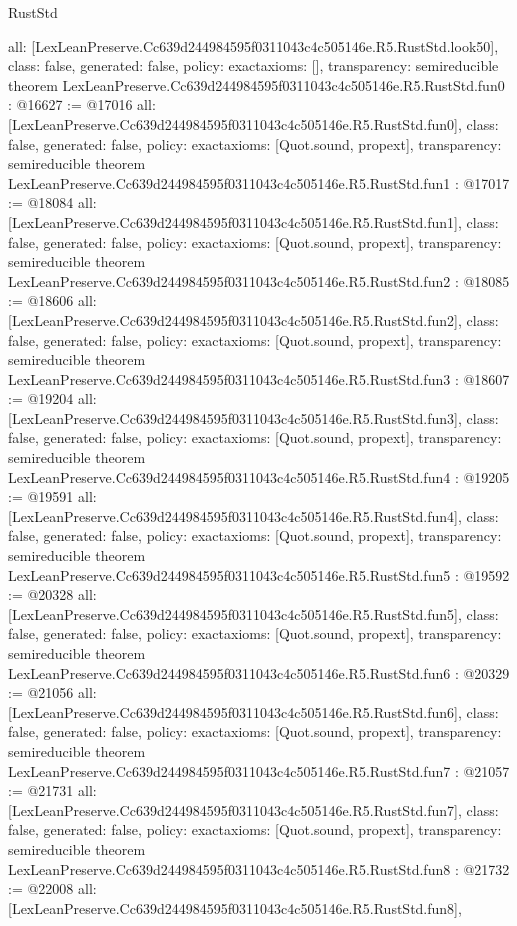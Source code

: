 \begin{lexlean}{RustStd}
\begin{coremodule}
{  all: [LexLeanPreserve.Cc639d244984595f0311043c4c505146e.R5.RustStd.look50],
  class: false,
  generated: false,
  policy: exact{axioms: []},
  transparency: semireducible
}
theorem LexLeanPreserve.Cc639d244984595f0311043c4c505146e.R5.RustStd.fun0 : @16627 := @17016 {
  all: [LexLeanPreserve.Cc639d244984595f0311043c4c505146e.R5.RustStd.fun0],
  class: false,
  generated: false,
  policy: exact{axioms: [Quot.sound, propext]},
  transparency: semireducible
}
theorem LexLeanPreserve.Cc639d244984595f0311043c4c505146e.R5.RustStd.fun1 : @17017 := @18084 {
  all: [LexLeanPreserve.Cc639d244984595f0311043c4c505146e.R5.RustStd.fun1],
  class: false,
  generated: false,
  policy: exact{axioms: [Quot.sound, propext]},
  transparency: semireducible
}
theorem LexLeanPreserve.Cc639d244984595f0311043c4c505146e.R5.RustStd.fun2 : @18085 := @18606 {
  all: [LexLeanPreserve.Cc639d244984595f0311043c4c505146e.R5.RustStd.fun2],
  class: false,
  generated: false,
  policy: exact{axioms: [Quot.sound, propext]},
  transparency: semireducible
}
theorem LexLeanPreserve.Cc639d244984595f0311043c4c505146e.R5.RustStd.fun3 : @18607 := @19204 {
  all: [LexLeanPreserve.Cc639d244984595f0311043c4c505146e.R5.RustStd.fun3],
  class: false,
  generated: false,
  policy: exact{axioms: [Quot.sound, propext]},
  transparency: semireducible
}
theorem LexLeanPreserve.Cc639d244984595f0311043c4c505146e.R5.RustStd.fun4 : @19205 := @19591 {
  all: [LexLeanPreserve.Cc639d244984595f0311043c4c505146e.R5.RustStd.fun4],
  class: false,
  generated: false,
  policy: exact{axioms: [Quot.sound, propext]},
  transparency: semireducible
}
theorem LexLeanPreserve.Cc639d244984595f0311043c4c505146e.R5.RustStd.fun5 : @19592 := @20328 {
  all: [LexLeanPreserve.Cc639d244984595f0311043c4c505146e.R5.RustStd.fun5],
  class: false,
  generated: false,
  policy: exact{axioms: [Quot.sound, propext]},
  transparency: semireducible
}
theorem LexLeanPreserve.Cc639d244984595f0311043c4c505146e.R5.RustStd.fun6 : @20329 := @21056 {
  all: [LexLeanPreserve.Cc639d244984595f0311043c4c505146e.R5.RustStd.fun6],
  class: false,
  generated: false,
  policy: exact{axioms: [Quot.sound, propext]},
  transparency: semireducible
}
theorem LexLeanPreserve.Cc639d244984595f0311043c4c505146e.R5.RustStd.fun7 : @21057 := @21731 {
  all: [LexLeanPreserve.Cc639d244984595f0311043c4c505146e.R5.RustStd.fun7],
  class: false,
  generated: false,
  policy: exact{axioms: [Quot.sound, propext]},
  transparency: semireducible
}
theorem LexLeanPreserve.Cc639d244984595f0311043c4c505146e.R5.RustStd.fun8 : @21732 := @22008 {
  all: [LexLeanPreserve.Cc639d244984595f0311043c4c505146e.R5.RustStd.fun8],
}
\end{coremodule}
\end{lexlean}
